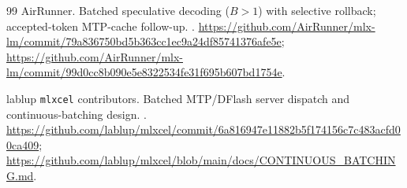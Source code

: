 \documentclass[10pt,twocolumn]{article}
\begin{document}
\begin{thebibliography}{99}
AirRunner.
\newblock Batched speculative decoding ($B>1$) with selective rollback;
accepted-token MTP-cache follow-up.
.
\url{https://github.com/AirRunner/mlx-lm/commit/79a836750bd5b363cc1ec9a24df85741376afe5e};
\url{https://github.com/AirRunner/mlx-lm/commit/99d0cc8b090e5e8322534fe31f695b607bd1754e}.

lablup \texttt{mlxcel} contributors.
\newblock Batched MTP/DFlash server dispatch and continuous-batching design.
.
\url{https://github.com/lablup/mlxcel/commit/6a816947e11882b5f174156c7c483acfd00ca409};
\url{https://github.com/lablup/mlxcel/blob/main/docs/CONTINUOUS_BATCHING.md}.
\end{thebibliography}
\end{document}
